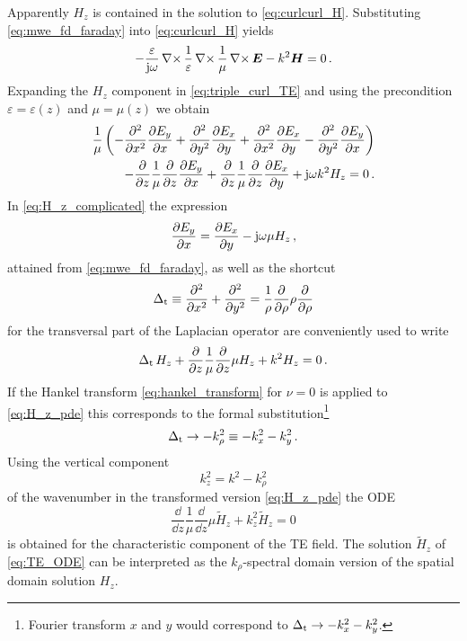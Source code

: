 Apparently $H_z$ is contained in the solution to \eqref{eq:curlcurl_H}. Substituting \eqref{eq:mwe_fd_faraday} into \eqref{eq:curlcurl_H} yields
\begin{equation}\label{eq:triple_curl_TE}
	- \frac{\varepsilon}{\im \omega}\curl\frac{1}{\varepsilon}\curl\frac{1}{\mu} \curl \pvec{E} - k^2\pvec{H} = 0 \,.
\end{equation}
Expanding the $H_z$ component in \eqref{eq:triple_curl_TE} and using the precondition $\varepsilon = \varepsilon\left(z\right)$ and $\mu = \mu\left(z\right)$ we obtain
\begin{equation}\label{eq:H_z_complicated}
	\begin{split}
		\frac{1}{\mu} \left(-\pdsec{x} \pd[E_y]{x} + \pdsec{y} \pd[E_x]{y} + \pdsec{x} \pd[E_x]{y} - \pdsec{y} \pd[E_y]{x}\right) \\ -\pd{z}\frac{1}{\mu}\pd{z}\pd[E_y]{x} + \pd{z}\frac{1}{\mu}\pd{z}\pd[E_x]{y} + \im \omega k^2 H_z = 0 \,.
	\end{split}
\end{equation}
In \eqref{eq:H_z_complicated} the expression
\begin{equation}
	\pd[E_y]{x} = \pd[E_x]{y} - \im \omega \mu H_z \,,
\end{equation}
attained from \eqref{eq:mwe_fd_faraday}, as well as the shortcut
\begin{equation}\label{eq:laplace_transversal}
	\laplaceTrans \equiv \frac{\partial^2}{\partial x^2} + \frac{\partial^2}{\partial y^2} = \frac{1}{\rho}\frac{\partial}{\partial \rho} \rho \frac{\partial}{\partial \rho}
\end{equation}
for the transversal part of the Laplacian operator \cite[p.~731]{Bronstein2016} are conveniently used to write
\begin{equation}\label{eq:H_z_pde}
	\laplaceTrans H_z + \frac{\partial}{\partial z}\frac{1}{\mu}\frac{\partial}{\partial z} \mu H_z + k^2 H_z = 0 \,.
\end{equation}
If the Hankel transform \eqref{eq:hankel_transform} for $\nu = 0$ is applied to \eqref{eq:H_z_pde} this corresponds to the formal substitution\footnote{Fourier transform \wrt $x$ and $y$ would correspond to $\laplaceTrans \rightarrow - k_x^2 - k_y^2$.} \cite{Michalski2016b}
\begin{equation}
	\laplaceTrans \rightarrow -k_\rho^2 \equiv - k_x^2 - k_y^2 \,.
\end{equation}
Using the vertical component
\begin{equation}\label{eq:k_z_square}
	k_z^2 = k^2 - k_\rho^2
\end{equation}
of the wavenumber in the transformed version \eqref{eq:H_z_pde} the \ac{ODE}
\begin{equation}\label{eq:TE_ODE}
	\frac{\dd}{\dd z}\frac{1}{\mu}\frac{\dd}{\dd z}\mu  \tilde{H}_z + k_z^2 \tilde{H}_z = 0
\end{equation}
is obtained for the characteristic component of the \ac{TE} field. The solution $\tilde{H}_z$ of \eqref{eq:TE_ODE} can be interpreted as the $k_\rho$-spectral domain version of the spatial domain solution $H_z$.


